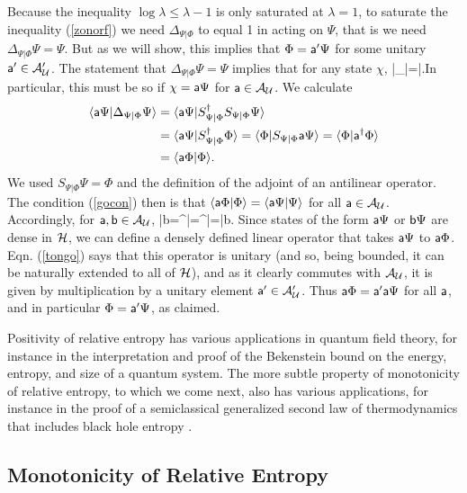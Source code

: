 \documentclass[12pt]{article}
\def\a{{\sf a}}
\def\b{{\sf b}}
\def\ra{\rangle}
\def\la{\langle}
\numberwithin{equation}{section}
\def\A{{\mathcal A}}
\begin{document}
Because the inequality $\log \lambda\leq \lambda -1$ is only saturated at $\lambda=1$, to saturate the inequality (\ref{zonorf})
we need $\Delta_{\Psi|\Phi}$ to equal 1 in acting on $\Psi$, that is we need $\Delta_{\Psi|\Phi}\Psi=\Psi$.  But as we will
show, this implies
 that $\Phi=\a'\Psi$ for some unitary $\a'\in \A_\U'$.   The statement that $\Delta_{\Psi|\Phi}\Psi=\Psi$ implies that for
any state $\chi$, 
\be\label{gocon}\la\chi|\Delta_{\Psi|\Phi}\Psi\ra=\la\chi|\Psi\ra.\ee    In particular, this must be so if $\chi=\a\Psi$
for $\a\in \A_\U$.  We calculate
\begin{align}
\begin{split}
\label{pikl} \la \a\Psi|\Delta_{\Psi|\Phi}\Psi\ra & =\la \a\Psi|S^\dagger_{\Psi|\Phi}S_{\Psi|\Phi}\Psi\ra\\
 &= \la \a\Psi|S_{\Psi|\Phi}^\dagger\Phi\ra=\la\Phi|S_{\Psi|\Phi}\a\Psi\ra=\la\Phi|\a^\dagger\Phi\ra \\
 & =\la \a\Phi|\Phi\ra.
 \end{split}
 \end{align}
 We used $S_{\Psi|\Phi}\Psi=\Phi$ and the definition of the adjoint of an antilinear operator.
 The condition (\ref{gocon}) then is that  $\la \a\Phi|\Phi\ra =\la \a\Psi|\Psi\ra$ for all
 $\a\in \A_\U$.  Accordingly, for $\a,\b\in\A_\U$,
 \be\label{tongo}\la \a\Phi|\b\Phi\ra=\la \b^\dagger\a\Phi|\Phi\ra =\la \b^\dagger \a\Psi|\Psi\ra =\la \a\Psi|\b\Psi\ra. \ee
 Since states of the form $\a\Psi$ or $\b\Psi$ are dense in ${\mathcal H}$, we can define a densely defined linear operator that takes
 $\a\Psi$ to $\a\Phi$.  Eqn. (\ref{tongo}) says that this operator is unitary (and so, being bounded, it can be naturally extended to
 all of ${\mathcal H}$), and as it clearly commutes with $\A_\U$,
 it is given by multiplication by a unitary element $\a'\in \A_\U'$.   Thus $\a\Phi=\a'\a\Psi$ for all $\a$, and in particular $\Phi=\a'\Psi$,
 as claimed.

Positivity of relative entropy has various applications in quantum field theory, for instance in the interpretation and 
proof \cite{Casini,LongoXu} of the Bekenstein bound on the energy, entropy, and size of a quantum system.  The more subtle property of monotonicity of relative entropy, to which we come next, also has various applications,
for instance in the proof of a semiclassical generalized second law of thermodynamics that includes black hole entropy \cite{Wall}.



\subsection{Monotonicity of Relative Entropy}\label{monrel}
\end{document}
